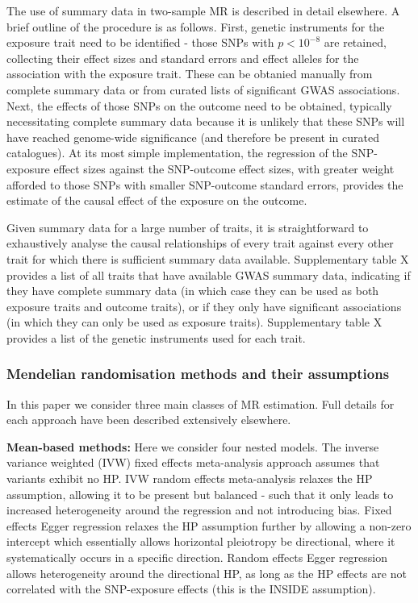 \documentclass[]{article}
\begin{document}
The use of summary data in two-sample MR is described in detail
elsewhere. A brief outline of the procedure is as follows. First,
genetic instruments for the exposure trait need to be identified - those
SNPs with \(p < 10^{-8}\) are retained, collecting their effect sizes
and standard errors and effect alleles for the association with the
exposure trait. These can be obtanied manually from complete summary
data or from curated lists of significant GWAS associations. Next, the
effects of those SNPs on the outcome need to be obtained, typically
necessitating complete summary data because it is unlikely that these
SNPs will have reached genome-wide significance (and therefore be
present in curated catalogues). At its most simple implementation, the
regression of the SNP-exposure effect sizes against the SNP-outcome
effect sizes, with greater weight afforded to those SNPs with smaller
SNP-outcome standard errors, provides the estimate of the causal effect
of the exposure on the outcome.

Given summary data for a large number of traits, it is straightforward
to exhaustively analyse the causal relationships of every trait against
every other trait for which there is sufficient summary data available.
Supplementary table X provides a list of all traits that have available
GWAS summary data, indicating if they have complete summary data (in
which case they can be used as both exposure traits and outcome traits),
or if they only have significant associations (in which they can only be
used as exposure traits). Supplementary table X provides a list of the
genetic instruments used for each trait.

\subsubsection{Mendelian randomisation methods and their
assumptions}\label{mendelian-randomisation-methods-and-their-assumptions}

In this paper we consider three main classes of MR estimation. Full
details for each approach have been described extensively elsewhere.

\textbf{Mean-based methods:} Here we consider four nested models. The
inverse variance weighted (IVW) fixed effects meta-analysis approach
assumes that variants exhibit no HP. IVW random effects meta-analysis
relaxes the HP assumption, allowing it to be present but balanced - such
that it only leads to increased heterogeneity around the regression and
not introducing bias. Fixed effects Egger regression relaxes the HP
assumption further by allowing a non-zero intercept which essentially
allows horizontal pleiotropy be directional, where it systematically
occurs in a specific direction. Random effects Egger regression allows
heterogeneity around the directional HP, as long as the HP effects are
not correlated with the SNP-exposure effects (this is the INSIDE
assumption).
\end{document}
